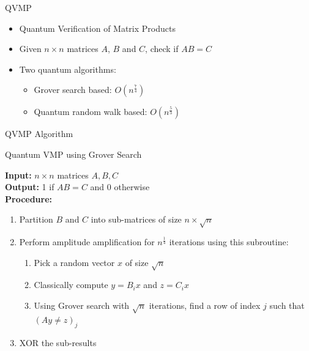 \documentclass[10pt]{beamer}
\begin{document}


\begin{frame}{QVMP}
  \begin{itemize}
    \item Quantum Verification of Matrix Products
    \item Given $n \times n$ matrices $A$, $B$ and $C$, check if $AB = C$
    \item {
        Two quantum algorithms:
        \begin{itemize}
          \item Grover search based: $O(n^{\frac{7}{4}})$
          \item Quantum random walk based: $O(n^{\frac{5}{3}})$
        \end{itemize}
    }
  \end{itemize}
\end{frame}


\begin{frame}{QVMP Algorithm}
\begin{algorithm}[H]
  \caption{Quantum VMP using Grover Search}
  \label{alg:qvmp_grover}
  \textbf{Input: } $n \times n$ matrices $A, B, C$ \\
  \textbf{Output: } 1 if $AB = C$ and 0 otherwise \\
  \textbf{Procedure: }
  \begin{enumerate}
    \item Partition $B$ and $C$ into sub-matrices of size $n \times \sqrt{n}$
    \item 
      {
        Perform amplitude amplification for $n^{\frac{1}{4}}$ iterations using this subroutine:
        \begin{enumerate}
          \item Pick a random vector $x$ of size $\sqrt{n}$
          \item Classically compute $y = B_ix$ and $z = C_ix$
          \item Using Grover search with $\sqrt{n}$ iterations, find a row of
            index $j$ such that $(Ay \neq z)_j$
        \end{enumerate}
      }
    \item XOR the sub-results
  \end{enumerate}
\end{algorithm}
\end{frame}
\end{document}
